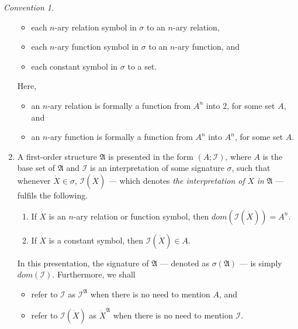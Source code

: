\documentclass[12pt, twoside]{memoir}
\numberwithin{equation}{section}
\theoremstyle{definition}
\theoremstyle{remark}
\newtheorem{con}[thm]{Convention}
\theoremstyle{definition}
\theoremstyle{definition}
\theoremstyle{definition}
\theoremstyle{remark}
\begin{document}
\begin{con}
\begin{enumerate}[label=(\arabic*)]
\begin{itemize}
        \item each $n$-ary relation symbol in $\sigma$ to an $n$-ary relation,
        \item each $n$-ary function symbol in $\sigma$ to an $n$-ary function, and
        \item each constant symbol in $\sigma$ to a set.
    \end{itemize}
    Here, 
    \begin{itemize}
        \item an $n$-ary relation is formally a function from $A^n$ into $2$, for some set $A$, and
        \item an $n$-ary function is formally a function from $A^n$ into $A^n$, for some set $A$.
    \end{itemize}
    \item A first-order structure $\mathfrak{A}$ is presented in the form $(A; \mathcal{I})$, where $A$ is the base set of $\mathfrak{A}$ and $\mathcal{I}$ is an interpretation of some signature $\sigma$, such that whenever $\dot{X} \in \sigma$, $\mathcal{I}(\dot{X})$ --- which denotes \emph{the interpretation of} $\dot{X}$ \emph{in} $\mathfrak{A}$ --- fulfils the following.
    \begin{enumerate}[label=(\alph*)]
        \item If $\dot{X}$ is an $n$-ary relation or function symbol, then $dom(\mathcal{I}(\dot{X})) = A^n$.
        \item If $\dot{X}$ is a constant symbol, then $\mathcal{I}(\dot{X}) \in A$.
    \end{enumerate}
    In this presentation, the signature of $\mathfrak{A}$ --- denoted as $\sigma(\mathfrak{A})$ --- is simply $dom(\mathcal{I})$. Furthermore, we shall \begin{itemize}
        \item refer to $\mathcal{I}$ as $\mathcal{I}^{\mathfrak{A}}$ when there is no need to mention $A$, and
        \item refer to $\mathcal{I}(\dot{X})$ as $\dot{X}^{\mathfrak{A}}$ when there is no need to mention $\mathcal{I}$.
    \end{itemize} 
    

\end{enumerate}
\end{con}
\end{document}
